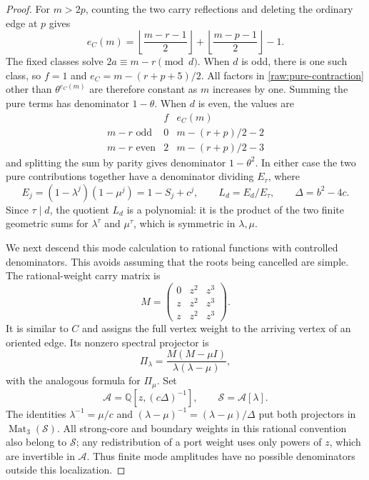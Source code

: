\documentclass[11pt]{amsart}
\theoremstyle{definition}
\theoremstyle{remark}
\numberwithin{equation}{section}
\begin{document}
\begin{proof}
For $m>2p$, counting the two carry reflections and deleting the
ordinary edge at $p$ gives
\[
 e_C(m)=\left\lfloor\frac{m-r-1}{2}\right\rfloor+
         \left\lfloor\frac{m-p-1}{2}\right\rfloor-1.
\]
The fixed classes solve $2a\equiv m-r\pmod d$.  When $d$ is odd,
there is one such class, so $f=1$ and
$e_C=m-(r+p+5)/2$.  All factors in
\eqref{raw:pure-contraction} other than $\theta^{e_C(m)}$ are
therefore constant as $m$ increases by one.  Summing the pure terms
has denominator $1-\theta$.  When $d$ is even, the values are
\[
 \begin{array}{c|cc}
 &f&e_C(m)\\\hline
 m-r\text{ odd}&0&m-(r+p)/2-2\\
 m-r\text{ even}&2&m-(r+p)/2-3
 \end{array}
\]
and splitting the sum by parity gives denominator $1-\theta^2$.
In either case the two pure contributions together have a denominator
dividing $E_\tau$, where
\[
 E_j=(1-\lambda^j)(1-\mu^j)=1-S_j+c^j,\qquad
 L_d=E_d/E_\tau,\qquad \Delta=b^2-4c.
\]
Since $\tau\mid d$, the quotient $L_d$ is a polynomial: it is the
product of the two finite geometric sums for $\lambda^\tau$ and
$\mu^\tau$, which is symmetric in $\lambda,\mu$.

We next descend this mode calculation to rational functions with
controlled denominators.  This avoids assuming that the roots being
cancelled are simple.  The rational-weight carry matrix is
\[
 M=\begin{pmatrix}0&z^2&z^3\\z&z^2&z^3\\z&z^2&z^3\end{pmatrix}.
\]
It is similar to $C$ and assigns the full vertex weight to the arriving
vertex of an oriented edge.  Its nonzero spectral projector is
\[
 \Pi_\lambda=\frac{M(M-\mu I)}{\lambda(\lambda-\mu)},
\]
with the analogous formula for $\Pi_\mu$.  Set
\[
 \mathcal A=\mathbb Q[z,(c\Delta)^{-1}],\qquad
 \mathcal S=\mathcal A[\lambda].
\]
The identities $\lambda^{-1}=\mu/c$ and
$(\lambda-\mu)^{-1}=(\lambda-\mu)/\Delta$ put both projectors in
$\operatorname{Mat}_3(\mathcal S)$.  All strong-core and boundary
weights in this rational convention also belong to $\mathcal S$;
any redistribution of a port weight uses only powers of $z$, which
are invertible in $\mathcal A$.  Thus finite mode amplitudes have no
possible denominators outside this localization.


\end{proof}
\end{document}
